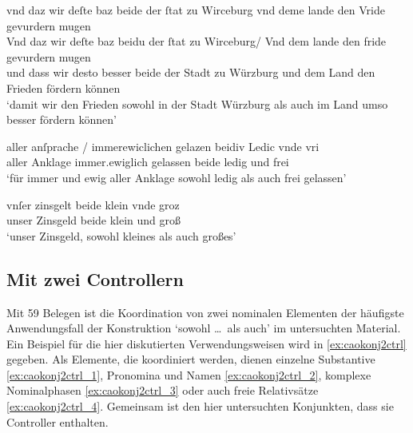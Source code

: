 \begin{exe}
\ex \label{ex:intraurkvar1}
	\begin{xlist}
	\ex \label{ex:intraurkvar1_1}
		\let\eachwordthree\eachwordtwo
		\let\eachwordtwo\eachwordone
		\glll vnd daz wir deſte baz beide der ſtat zu Wirceburg vnd
				deme lande den Vride gevurdern mugen \\
			Vnd daz wir deſte baz beidu der ſtat zu Wirceburg/ Vnd
				dem lande den fride gevurdern mugen \\
			und dass wir desto besser beide der Stadt zu Würzburg und dem Land 
				den Frieden fördern können \\
		\trans `damit wir den Frieden sowohl in der Stadt Würzburg als
			auch im Land umso besser fördern können'
			\parencites(Nrn.~1126~AB, Würzburg, 1289)[414,36--38 bzw.~37--39]{cao2}
	\end{xlist}

\ex \label{ex:intraurkvar2}
	\begin{xlist}
	\ex \label{ex:intraurkvar2_1}
		\gll aller anſprache / immerewiclichen gelazen beidiv Ledic
				vnde vri \\
			aller Anklage {} immer.ewiglich gelassen beide ledig und frei \\
		\trans `für immer und ewig aller Anklage sowohl ledig als auch frei
			gelassen'
			\parencites(Nr.~2293, Bamberg, 1295)[420,23]{cao3}

	\ex \label{ex:intraurkvar2_2}
		\gll vnſer zinsgelt beide klein vnde groz \\
			unser Zinsgeld beide klein und groß \\
		\trans `unser Zinsgeld, sowohl kleines als auch großes'
			\parencites(Nr.~2293, Bamberg, 1295)[420.30]{cao3}
	\end{xlist}
\end{exe}

\subsection{Mit zwei Controllern}
\label{subsec:caokonj2ctrl}

Mit 59 Belegen ist die Koordination von zwei nominalen Elementen der häufigste
Anwendungsfall der Konstruktion  `sowohl \dots\
als auch' im untersuchten Material. Ein Beispiel für die hier diskutierten
Verwendungsweisen wird in \cref{ex:caokonj2ctrl} gegeben. Als Elemente, die
koordiniert werden, dienen einzelne Substantive \cref{ex:caokonj2ctrl_1},
Pronomina und Namen \cref{ex:caokonj2ctrl_2}, komplexe Nominalphasen
\cref{ex:caokonj2ctrl_3} oder auch freie Relativsätze \cref{ex:caokonj2ctrl_4}.
Gemeinsam ist den hier untersuchten Konjunkten, dass sie Controller enthalten.

